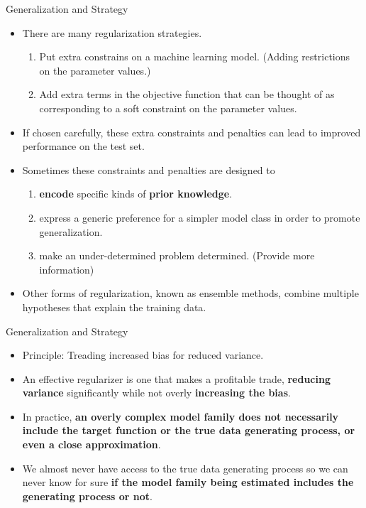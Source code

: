 \documentclass[10pt]{beamer}
\begin{document}
	\begin{frame}{Generalization and Strategy}
		\begin{itemize}
			\item There are many regularization strategies.
			\begin{enumerate}
				\pause
				\item Put extra constrains on a machine learning model. (Adding restrictions on the parameter values.)
				\pause
				\item Add extra terms in the objective function that can be thought of as corresponding to a soft constraint on the parameter values.
			\end{enumerate}
			\pause
			\item If chosen carefully, these extra constraints and penalties can lead to improved performance on the test set.
			\pause
			\item Sometimes these constraints and penalties are designed to
			\begin{enumerate}
				\item \textbf{encode} specific kinds of \textbf{prior knowledge}.
				\item express a generic preference for a simpler model class in order to promote generalization.
				\item make an under-determined problem determined. (Provide more information)
			\end{enumerate}
			\pause
			\item Other forms of regularization, known as ensemble methods, combine multiple hypotheses that explain the training data.
		\end{itemize}
	\end{frame}
	
	\begin{frame}{Generalization and Strategy}
		\begin{itemize}
			\item Principle: Treading increased bias for reduced variance.
			\pause
			\item An effective regularizer is one that makes a profitable trade, \textbf{reducing variance} significantly while not overly \textbf{increasing the bias}.
			\pause
			\item In practice, \textbf{an overly complex model family does not necessarily include the target function or the true data generating process, or even a close approximation}.
			\pause
			\item We almost never have access to the true data generating process so we can never know for sure \textbf{if the model family being estimated includes the generating process or not}.		
		\end{itemize}
	\end{frame}
\end{document}
